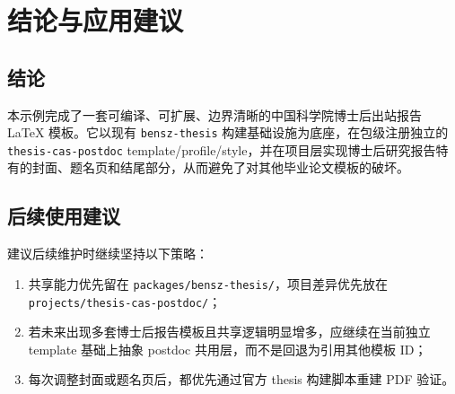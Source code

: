 \chapter{结论与应用建议}

\section{结论}

本示例完成了一套可编译、可扩展、边界清晰的中国科学院博士后出站报告 LaTeX 模板。它以现有 \texttt{bensz-thesis} 构建基础设施为底座，在包级注册独立的 \texttt{thesis-cas-postdoc} template/profile/style，并在项目层实现博士后研究报告特有的封面、题名页和结尾部分，从而避免了对其他毕业论文模板的破坏。

\section{后续使用建议}

建议后续维护时继续坚持以下策略：

\begin{enumerate}
  \item 共享能力优先留在 \texttt{packages/bensz-thesis/}，项目差异优先放在 \texttt{projects/thesis-cas-postdoc/}；
  \item 若未来出现多套博士后报告模板且共享逻辑明显增多，应继续在当前独立 template 基础上抽象 postdoc 共用层，而不是回退为引用其他模板 ID；
  \item 每次调整封面或题名页后，都优先通过官方 thesis 构建脚本重建 PDF 验证。
\end{enumerate}

